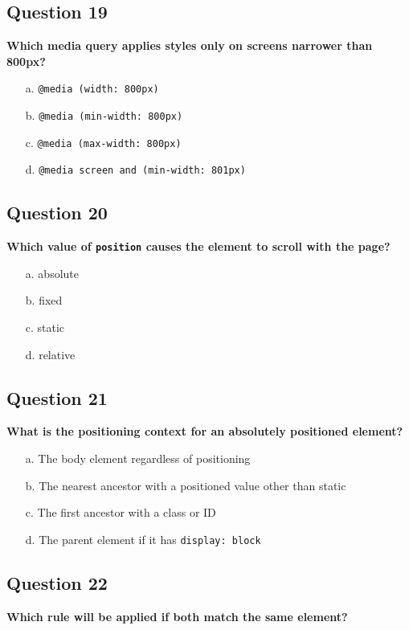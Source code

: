 \documentclass{article}
\begin{document}
\subsection*{Question 19}
\textbf{Which media query applies styles only on screens narrower than 800px?}

\begin{itemize}
  \item[a.] \texttt{@media (width: 800px)}
  \item[b.] \texttt{@media (min-width: 800px)}
  \item[c.] \texttt{@media (max-width: 800px)}
  \item[d.] \texttt{@media screen and (min-width: 801px)}
\end{itemize}

\subsection*{Question 20}
\textbf{Which value of \texttt{position} causes the element to scroll with the page?}

\begin{itemize}
  \item[a.] absolute
  \item[b.] fixed
  \item[c.] static
  \item[d.] relative
\end{itemize}

\subsection*{Question 21}
\textbf{What is the positioning context for an absolutely positioned element?}

\begin{itemize}
  \item[a.] The body element regardless of positioning
  \item[b.] The nearest ancestor with a positioned value other than static
  \item[c.] The first ancestor with a class or ID
  \item[d.] The parent element if it has \texttt{display: block}
\end{itemize}

\subsection*{Question 22}
\textbf{Which rule will be applied if both match the same element?}
\end{document}

